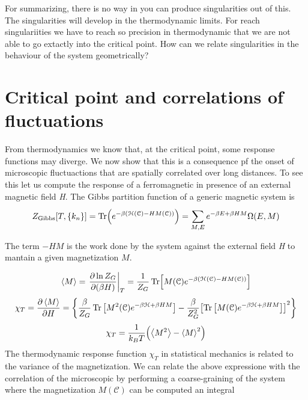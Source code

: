 \documentclass[../main/main.tex]{subfiles}
\begin{document}
For summarizing, there is no way in you can produce singularities out of this. The singularities will develop in the thermodynamic limits. For reach singulariities we have to reach so precision in thermodynamic that we are not able to go extactly into the critical point. How can we relate singularities in the behaviour of the system geometrically?

 \section{Critical point and correlations of fluctuations}
 From thermodynamics we know that, at the critical point, some response functions may diverge. We now show that this is a consequence pf the onset of microscopic fluctuactions that are spatially correlated over long distances.
 To see this let us compute the response of a ferromagnetic in presence of an external magnetic field \emph{H}.
 The Gibbs partition function of a generic magnetic system is
 \begin{equation}
   Z_{\text{Gibbs}} [T,\{ k_n \}  ] = \Tr(e^{-\beta (\mathcal{H} (\mathcal{C}) - H M (\mathcal{C}))} ) = \sum_{M,E}^{} e^{-\beta E + \beta H M} \Omega (E,M)
 \end{equation}
\begin{remark}
The term \( - H M \) is the work done by the system against the external field \emph{H} to mantain a given magnetization \( M \).
\end{remark}
\begin{equation}
  \expval{M} = \eval{ \pdv{\ln{Z_G} }{(\beta H)} }_T = \frac{1}{Z_G} \Tr[M (\mathcal{C}) e^{-\beta ( \mathcal{H} (\mathcal{C}) - H M (\mathcal{C}))} ]
\end{equation}
\begin{equation}
  \chi _T = \pdv{\expval{M} }{H} = \qty{\frac{\beta }{Z_G} \Tr \qty[M^2 (\mathcal{C}) e^{-\beta \mathcal{H} + \beta H M} ] - \frac{\beta }{Z_G^2} \qty[ \Tr \qty[M (\mathcal{C}) e^{-\beta \mathcal{H} + \beta H M } ]  ]^2 }
\end{equation}
\begin{equation}
  \chi _T = \frac{1}{k_B T} \qty(\expval{M^2} - \expval{M}^2  )
\end{equation}
The thermodynamic response function \( \chi _T \) in statistical mechanics is related to the variance of the magnetization.
We can relate the above expressione with the correlation of the microscopic by performing a coarse-graining of the system where the magnetization \( M (\mathcal{C}) \)  can be computed  an integral
\end{document}

